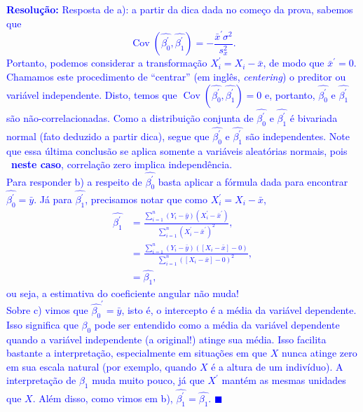 \documentclass[a4paper,10pt, notitlepage]{report}
\begin{document}
\textcolor{blue}{
\textbf{Resolução:}
Resposta de a): a partir da dica dada no começo da prova, sabemos que 
$$ \operatorname{Cov}\left(\hat{\beta_0^\prime}, \hat{\beta_1^\prime} \right)  = -\frac{\bar{x}^\prime\sigma^2}{s_x^2}.$$
Portanto, podemos considerar a transformação $X_i^\prime = X_i -\bar{x}$, de modo que $\bar{x}^\prime = 0$.
Chamamos este procedimento de ``centrar'' (em inglês, \textit{centering}) o preditor ou variável independente.
Disto, temos que $\operatorname{Cov}\left(\hat{\beta_0^\prime}, \hat{\beta_1^\prime} \right)  = 0$ e, portanto, $\hat{\beta_0^\prime}$ e $\hat{\beta_1^\prime}$ são não-correlacionadas.
Como a distribuição conjunta de $\hat{\beta_0^\prime}$ e $\hat{\beta_1^\prime}$ é bivariada normal (fato deduzido a partir dica), segue que  $\hat{\beta_0^\prime}$ e $\hat{\beta_1^\prime}$ são independentes.
Note que essa última conclusão se aplica somente a variáveis aleatórias normais, pois ~\textbf{neste caso}, correlação zero implica independência.\\
Para responder b) a respeito de $\hat{\beta_0^\prime}$ basta aplicar a fórmula dada para encontrar $\hat{\beta_0^\prime} = \bar{y}$.
Já para $\hat{\beta_1^\prime}$, precisamos notar que como $X_i^\prime = X_i - \bar{x}$,
\begin{align*}
 \hat{\beta_1^\prime} &= \frac{\sum_{i=1}^n (Y_i-\bar{y})(X_i^\prime-\bar{x}^\prime)}{\sum_{i=1}^n \left(X_i^\prime - \bar{x}^\prime\right)^2},\\
 &= \frac{\sum_{i=1}^n (Y_i-\bar{y})([X_i-\bar{x}]-0)}{\sum_{i=1}^n \left( [X_i-\bar{x}] - 0\right)^2},\\
 &= \hat{\beta_1},
\end{align*}
ou seja, a estimativa do coeficiente angular não muda!\\
Sobre c) vimos que $\hat{\beta_0}^\prime = \bar{y}$, isto é, o intercepto é a média da variável dependente.
Isso significa que $\beta_0$ pode ser entendido como a média da variável dependente quando a variável independente (a original!) atinge sua média.
Isso facilita bastante a interpretação, especialmente em situações em que $X$ nunca atinge zero em sua escala natural (por exemplo, quando $X$ é a altura de um indivíduo).
A interpretação de $\beta_1$ muda muito pouco, já que $X^\prime$ mantém as mesmas unidades que $X$.
Além disso, como vimos em b), $\hat{\beta_1^\prime} = \hat{\beta_1}$.
$\blacksquare$
}

\newpage
\end{document}
